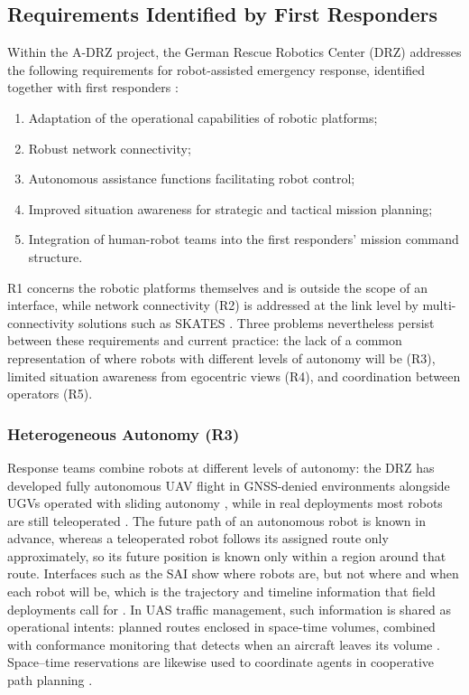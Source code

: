 \documentclass{article}
\begin{document}
\subsection{Requirements Identified by First Responders}
Within the A-DRZ project, the German Rescue Robotics Center (DRZ) addresses the following requirements for robot-assisted emergency response, identified together with first responders \cite{kruijff2021}:
\begin{enumerate}[label=\textbf{R\arabic*}]
  \item Adaptation of the operational capabilities of robotic platforms;
  \item Robust network connectivity;
  \item Autonomous assistance functions facilitating robot control;
  \item Improved situation awareness for strategic and tactical mission planning;
  \item Integration of human-robot teams into the first responders' mission command structure.
\end{enumerate}
R1 concerns the robotic platforms themselves and is outside the scope of an interface, while network connectivity (R2) is addressed at the link level by multi-connectivity solutions such as SKATES \cite{kruijff2021}.
Three problems nevertheless persist between these requirements and current practice: the lack of a common representation of where robots with different levels of autonomy will be (R3), limited situation awareness from egocentric views (R4), and coordination between operators (R5).

\subsubsection{Heterogeneous Autonomy (R3)}
Response teams combine robots at different levels of autonomy: the DRZ has developed fully autonomous UAV flight in GNSS-denied environments alongside UGVs operated with sliding autonomy \cite{kruijff2021}, while in real deployments most robots are still teleoperated \cite{surmann2024}.
The future path of an autonomous robot is known in advance, whereas a teleoperated robot follows its assigned route only approximately, so its future position is known only within a region around that route.
Interfaces such as the SAI show where robots are, but not where and when each robot will be, which is the trajectory and timeline information that field deployments call for \cite{surmann2024}.
In UAS traffic management, such information is shared as operational intents: planned routes enclosed in space-time volumes, combined with conformance monitoring that detects when an aircraft leaves its volume \cite{astmf3548}.
Space--time reservations are likewise used to coordinate agents in cooperative path planning \cite{silver2005}.
\end{document}
